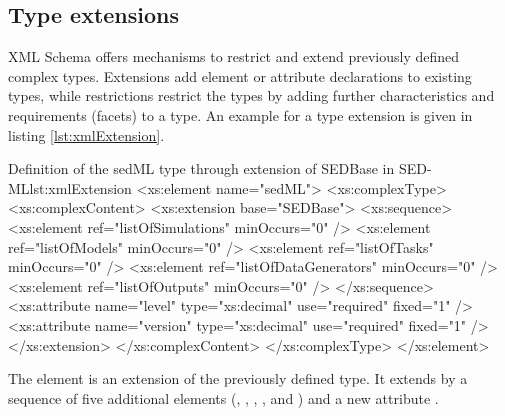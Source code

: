 \subsection{Type extensions}
XML Schema offers mechanisms to restrict and extend previously defined complex types. Extensions add element or attribute declarations to existing types, while restrictions restrict the types by adding further characteristics and requirements (facets) to a type. An example for a type extension is given in listing \ref{lst:xmlExtension}.
%
\begin{myXmlLst}{Definition of the sedML type through extension of SEDBase in SED-ML}{lst:xmlExtension}
	<xs:element name="sedML">
		<xs:complexType>
			<xs:complexContent>
				<xs:extension base="SEDBase">
					<xs:sequence>
						<xs:element ref="listOfSimulations" minOccurs="0" />
						<xs:element ref="listOfModels" minOccurs="0" />
						<xs:element ref="listOfTasks" minOccurs="0" />
						<xs:element ref="listOfDataGenerators" minOccurs="0" />
						<xs:element ref="listOfOutputs" minOccurs="0" />
					</xs:sequence>
					<xs:attribute name="level" type="xs:decimal" use="required"
						fixed="1" />
					<xs:attribute name="version" type="xs:decimal" use="required"
						fixed="1" />
				</xs:extension>
			</xs:complexContent>
		</xs:complexType>
	</xs:element>
\end{myXmlLst}
%
The  element is an extension of the previously defined  type. It extends  by a sequence of five additional elements (, , , , and ) and a new attribute .






